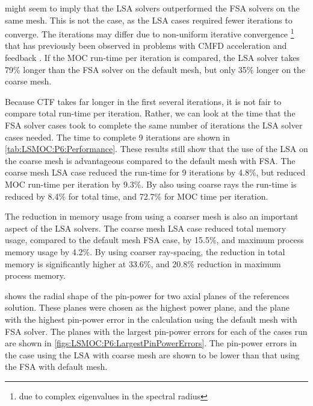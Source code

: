 {{{       might seem to imply that the \ac{LSA} solvers outperformed the \ac{FSA} solvers on the same mesh.
      This is not the case, as the \ac{LSA} cases required fewer iterations to converge.
      The iterations may differ due to non-uniform iterative convergence \footnote{due to complex eigenvalues in the spectral radius} that has previously been observed in problems with \ac{CMFD} acceleration and feedback \cite{Kochunas2017}.
      If the \ac{MOC} run-time per iteration is compared, the \ac{LSA} solver takes 79\% longer than the \ac{FSA} solver on the default mesh, but only 35\% longer on the coarse mesh.

      Because \ac{CTF} takes far longer in the first several iterations, it is not fair to compare total run-time per iteration.
      Rather, we can look at the time that the \ac{FSA} solver cases took to complete the same number of iterations the \ac{LSA} solver cases needed.
      The time to complete 9 iterations are shown in \cref{tab:LSMOC:P6:Performance}.
      These results still show that the use of the \ac{LSA} on the coarse mesh is advantageous compared to the default mesh with \ac{FSA}.
      The coarse mesh \ac{LSA} case reduced the run-time for 9 iterations by 4.8\%, but reduced \ac{MOC} run-time per iteration by 9.3\%.
      By also using coarse rays the run-time is reduced by 8.4\% for total time, and 72.7\% for \ac{MOC} time per iteration.

      The reduction in memory usage from using a coarser mesh is also an important aspect of the \ac{LSA} solvers.
      The coarse mesh \ac{LSA} case reduced total memory usage, compared to the default mesh \ac{FSA} case, by 15.5\%, and maximum process memory usage by 4.2\%.
      By using coarser ray-spacing, the reduction in total memory is significantly higher at 33.6\%, and 20.8\% reduction in maximum process memory.

       shows the radial shape of the pin-power for two axial planes of the references solution.
      These planes were chosen as the highest power plane, and the plane with the highest pin-power error in the calculation using the default mesh with \ac{FSA} solver.
      The planes with the largest pin-power errors for each of the cases run are shown in \cref{figs:LSMOC:P6:LargestPinPowerErrors}.
      The pin-power errors in the case using the \ac{LSA} with coarse mesh are shown to be lower than that using the \ac{FSA} with default mesh.

}}}
